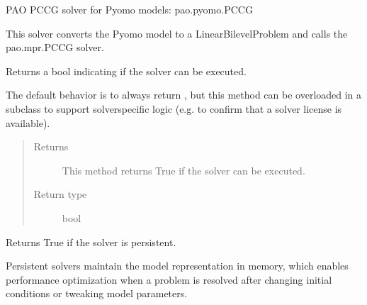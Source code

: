 \documentclass[letterpaper,10pt,english]{sphinxmanual}
\begin{document}
\begin{fulllineitems}
\label{\detokenize{reference/pyomo:pao.pyomo.solvers.mpr_solvers.PyomoSubmodelSolver_PCCG}}
PAO PCCG solver for Pyomo models: pao.pyomo.PCCG

This solver converts the Pyomo model to a LinearBilevelProblem and
calls the pao.mpr.PCCG solver.

\begin{fulllineitems}
\label{\detokenize{reference/pyomo:pao.pyomo.solvers.mpr_solvers.PyomoSubmodelSolver_PCCG.available}}
Returns a bool indicating if the solver can be executed.

The default behavior is to always return , but this method
can be overloaded in a subclass to support solver\sphinxhyphen{}specific logic
(e.g.  to confirm that a solver license is available).
\begin{quote}\begin{description}
\item[{Returns}] \leavevmode
This method returns True if the solver can be executed.

\item[{Return type}] \leavevmode
bool

\end{description}\end{quote}

\end{fulllineitems}


\begin{fulllineitems}
\label{\detokenize{reference/pyomo:pao.pyomo.solvers.mpr_solvers.PyomoSubmodelSolver_PCCG.is_persistent}}
Returns True if the solver is persistent.

Persistent solvers maintain the model representation in memory,
which enables performance optimization when a problem is resolved
after changing initial conditions or tweaking model parameters.


\end{fulllineitems}
\end{fulllineitems}
\end{document}
